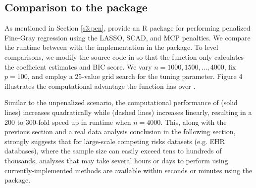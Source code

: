 
\subsection[Comparison to the crrp package]{Comparison to the  package}
\label{s3:crrp}
As mentioned in Section \ref{s3:pen}, \cite{fu2017penalized} provide an {R} package  for performing penalized Fine-Gray regression using the LASSO, SCAD, and MCP penalties. We compare the runtime between  with the implementation in the  package. To level comparisons, we modify the source code in  so that the function only calculates the coefficient estimates and BIC score. We vary $n = 1000, 1500, \ldots, 4000$, fix $p = 100$,  and employ a  25-value grid search for the tuning parameter. Figure 4 illustrates the computational advantage the 
function has over . 

Similar to the unpenalized scenario, the computational performance of  (solid lines) increases quadratically while  (dashed lines) increases linearly, resulting in a 200 to 300-fold speed up in runtime when $n = 4000$. This, along with the previous section and a real data analysis conclusion in the following section, strongly suggests that for large-scale competing risks datasets (e.g. EHR databases), where the sample size can easily exceed tens to hundreds of thousands, analyses that may take several hours or days to perform using currently-implemented methods are available within seconds or minutes using the  package.

